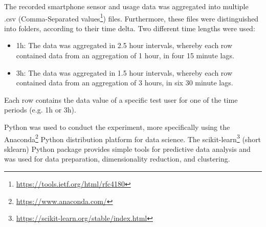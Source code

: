 The recorded smartphone sensor and usage data was aggregated into multiple .csv (Comma-Separated values\footnote{\url{https://tools.ietf.org/html/rfc4180}}) files. Furthermore, these files were distinguished into folders, according to their time delta. Two different time lengths were used:

\begin{itemize}
  \item 1h: The data was aggregated in 2.5 hour intervals, whereby each row contained data from an aggregation of 1 hour, in four 15 minute lags.
  \item 3h: The data was aggregated in 1.5 hour intervals, whereby each row contained data from an aggregation of 3 hours, in six 30 minute lags.
\end{itemize}

Each row contains the data value of a specific test user for one of the time periods (e.g. 1h or 3h).

Python was used to conduct the experiment, more specifically using the Anaconda\footnote{\url{https://www.anaconda.com/}} Python distribution platform for data science. The scikit-learn\footnote{\url{https://scikit-learn.org/stable/index.html}} (short sklearn) Python package provides simple tools for predictive data analysis and was used for data preparation, dimensionality reduction, and clustering.








